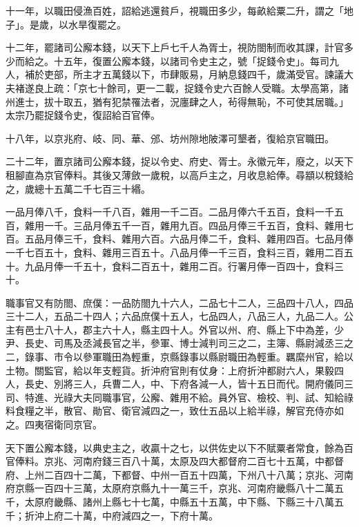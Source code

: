 \begin{pinyinscope}
 十一年，以職田侵漁百姓，詔給逃還貧戶，視職田多少，每畝給粟二升，謂之「地子」。是歲，以水旱復罷之。



 十二年，罷諸司公廨本錢，以天下上戶七千人為胥士，視防閤制而收其課，計官多少而給之。十五年，復置公廨本錢，以諸司令史主之，號「捉錢令史」。每司九人，補於吏部，所主才五萬錢以下，市肆販易，月納息錢四千，歲滿受官。諫議大夫褚遂良上疏：「京七十餘司，更一二載，捉錢令史六百餘人受職。太學高第，諸州進士，拔十取五，猶有犯禁罹法者，況廛肆之人，茍得無恥，不可使其居職。」太宗乃罷捉錢令史，復詔給百官俸。



 十八年，以京兆府、岐、同、華、邠、坊州隙地陂澤可墾者，復給京官職田。



 二十二年，置京諸司公廨本錢，捉以令史、府史、胥士。永徽元年，廢之，以天下租腳直為京官俸料。其後又薄斂一歲稅，以高戶主之，月收息給俸。尋顓以稅錢給之，歲總十五萬二千七百三十緡。



 一品月俸八千，食料一千八百，雜用一千二百。二品月俸六千五百，食料一千五百，雜用一千。三品月俸五千一百，雜用九百。四品月俸三千五百，食料、雜用七百。五品月俸三千，食料、雜用六百。六品月俸二千，食料、雜用四百。七品月俸一千七百五十，食料、雜用三百五十。八品月俸一千三百，食料三百，雜用二百五十。九品月俸一千五十，食料二百五十，雜用二百。行署月俸一百四十，食料三十。



 職事官又有防閤、庶僕：一品防閤九十六人，二品七十二人，三品四十八人，四品三十二人，五品二十四人；六品庶僕十五人，七品四人，八品三人，九品二人。公主有邑士八十人，郡主六十人，縣主四十人。外官以州、府、縣上下中為差，少尹、長史、司馬及丞減長官之半，參軍、博士減判司三之二，主簿、縣尉減丞三之二，錄事、市令以參軍職田為輕重，京縣錄事以縣尉職田為輕重。羈縻州官，給以土物。關監官，給以年支輕貨。折沖府官則有仗身：上府折沖都尉六人，果毅四人，長史、別將三人，兵曹二人，中、下府各減一人，皆十五日而代。開府儀同三司、特進、光祿大夫同職事官，公廨、雜用不給。員外官、檢校、判、試、知給祿料食糧之半，散官、勛官、衛官減四之一，致仕五品以上給半祿，解官充侍亦如之。四夷宿衛同京官。



 天下置公廨本錢，以典史主之，收贏十之七，以供佐史以下不賦粟者常食，餘為百官俸料。京兆、河南府錢三百八十萬，太原及四大都督府二百七十五萬，中都督府、上州二百四十二萬，下都督、中州一百五十四萬，下州八十八萬；京兆、河南府京縣一百四十三萬，太原府京縣九十一萬三千，京兆、河南府畿縣八十二萬五千，太原府畿縣、諸州上縣七十七萬，中縣五十五萬，中下縣、下縣三十八萬五千；折沖上府二十萬，中府減四之一，下府十萬。




\end{pinyinscope}
